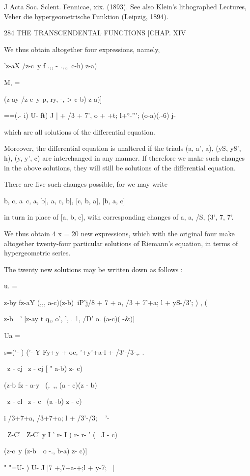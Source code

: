 J Acta Soc. Sclent. Fennicae, xix. (1893). See also Klein's
lithographed Lectures, Veher die hypergeometrische Funktion (Leipzig,
1894).

284 THE TRANSCENDENTAL FUNCTIONS [CHAP. XIV

We thus obtain altogether four expressions, namely,

'z-aX /z-c\ y f .,, - .,,,\ c-h) z-a)\

M, =

(z-ay /z-c\ y p, ry, -, > c-b) z-a)]

 ==(.- i) U- ft) J | + /3 + 7', o + +t; l+°-'''; (o-a)(.-6) j-

which are all solutions of the differential equation.

Moreover, the differential equation is unaltered if the triads (a, a',
a), (yS, y8', h), (y, y', c) are interchanged in any manner. If
therefore we make such changes in the above solutions, they will still
be solutions of the differential equation.

There are five such changes possible, for we may write

 b, c, a\, c, a, b], a, c, b], [c, b, a], [b, a, c]

in turn in place of [a, b, c], with corresponding changes of a, a, /S,
(3', 7, 7'.

We thus obtain 4 x = 20 new expressions, which with the original four
make altogether twenty-four particular solutions of Riemann's
equation, in terms of hypergeometric series.

The twenty new solutions may be written down as follows :

u. =

z-by fz-aY (,,, a-c)(z-b)\ iP'j/8 + 7 + a, /3 + 7'+a; l + yS-/3'; )
, (

z-b\ \ ' [z-ay t q,, o', ', . 1, /D' o. (a-c)( -\&)]

Ua =

 s=('- ) ('- Y Fy+y + oc, '+y'+a-l + /3'-/3-,. .

\ z - cj \ z - cj [ " a-b) z- c)

(z-b fz - a-y \ (, \,,, (a - c)(z - b)

\ z - cl \ z - c \ (a -b) z - c)

i /3+7+a, /3+7+a; l + /3'-/3; ~ '-\

\ Z-C' \ Z-C' y I ' r- I ) r- r- ' ( \ J - c)\

(z-c\ y (z-b\ \, o -., b-a) z- c)]

" "=U- ) U- J |7 +,7+a-+;l + y-7; \; \ |


